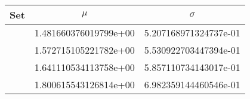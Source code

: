 

\begin{tabular}{@{}cS[table-format=1.3, scientific-notation=fixed, fixed-exponent=0]S@{}}
\toprule
Set 			& {$\mu$}					& {$\sigma$} \\	
\midrule
%
\ferdosiOne		& 1.481660376019799e+00 	& 5.207168971324737e-01 \\
\baakmanOne 	& 1.572715105221782e+00 	& 5.530922703447394e-01 \\
\baakmanFour 	& 1.641110534113758e+00 	& 5.857110734143017e-01 \\
\baakmanFive 	& 1.800615543126814e+00 	& 6.982359144460546e-01 \\
\bottomrule
\end{tabular}



